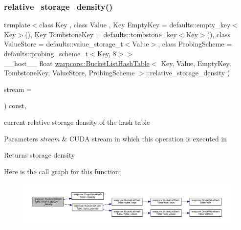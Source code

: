 \subsubsection{\texorpdfstring{relative\+\_\+storage\+\_\+density()}{relative\_storage\_density()}}
{\footnotesize\ttfamily template$<$class Key , class Value , Key Empty\+Key = defaults\+::empty\+\_\+key$<$\+Key$>$(), Key Tombstone\+Key = defaults\+::tombstone\+\_\+key$<$\+Key$>$(), class Value\+Store  = defaults\+::value\+\_\+storage\+\_\+t$<$\+Value$>$, class Probing\+Scheme  = defaults\+::probing\+\_\+scheme\+\_\+t$<$\+Key, 8$>$$>$ \\
\+\_\+\+\_\+host\+\_\+\+\_\+ float \hyperlink{classwarpcore_1_1BucketListHashTable}{warpcore\+::\+Bucket\+List\+Hash\+Table}$<$ Key, Value, Empty\+Key, Tombstone\+Key, Value\+Store, Probing\+Scheme $>$\+::relative\+\_\+storage\+\_\+density (\begin{DoxyParamCaption}\item[{const cuda\+Stream\+\_\+t}]{stream = {} }\end{DoxyParamCaption}) const\hspace{0.3cm}{\ttfamily [inline]}, {\ttfamily [noexcept]}}



current relative storage density of the hash table 


\begin{DoxyParams}{Parameters}
{\em stream} & C\+U\+DA stream in which this operation is executed in \\
\hline
\end{DoxyParams}
\begin{DoxyReturn}{Returns}
storage density 
\end{DoxyReturn}
Here is the call graph for this function\+:
\nopagebreak
\begin{figure}[H]
\begin{center}
\leavevmode
\includegraphics[width=350pt]{classwarpcore_1_1BucketListHashTable_a7c5ccd6a8c7976db19951ea0ecd3aafc_cgraph}
\end{center}
\end{figure}
\mbox{\label{classwarpcore_1_1BucketListHashTable_aaec71d3af4c78150ca47a50adf0dd054}} 
